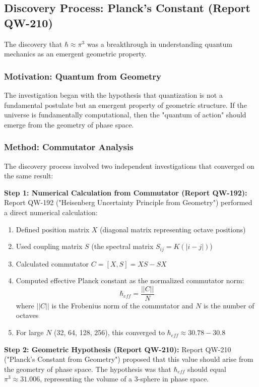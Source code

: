 \documentclass[11pt, a4paper]{article}
\begin{document}
\subsection{Discovery Process: Planck's Constant (Report QW-210)}

The discovery that $\hbar \approx \pi^3$ was a breakthrough in understanding quantum mechanics as an emergent geometric property.

\subsubsection{Motivation: Quantum from Geometry}

The investigation began with the hypothesis that quantization is not a fundamental postulate but an emergent property of geometric structure. If the universe is fundamentally computational, then the "quantum of action" should emerge from the geometry of phase space.

\subsubsection{Method: Commutator Analysis}

The discovery process involved two independent investigations that converged on the same result:

\textbf{Step 1: Numerical Calculation from Commutator (Report QW-192):}
Report QW-192 ("Heisenberg Uncertainty Principle from Geometry") performed a direct numerical calculation:
\begin{enumerate}
    \item Defined position matrix $X$ (diagonal matrix representing octave positions)
    \item Used coupling matrix $S$ (the spectral matrix $S_{ij} = K(|i-j|)$)
    \item Calculated commutator $C = [X, S] = XS - SX$
    \item Computed effective Planck constant as the normalized commutator norm:
    \begin{equation}
    \hbar_{eff} = \frac{||C||}{N}
    \end{equation}
    where $||C||$ is the Frobenius norm of the commutator and $N$ is the number of octaves
    \item For large $N$ (32, 64, 128, 256), this converged to $\hbar_{eff} \approx 30.78 - 30.8$
\end{enumerate}

\textbf{Step 2: Geometric Hypothesis (Report QW-210):}
Report QW-210 ("Planck's Constant from Geometry") proposed that this value should arise from the geometry of phase space. The hypothesis was that $\hbar_{eff}$ should equal $\pi^3 \approx 31.006$, representing the volume of a 3-sphere in phase space.
\end{document}
